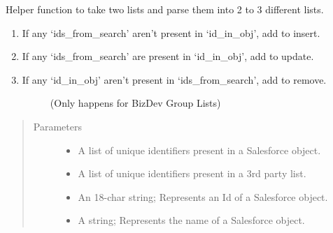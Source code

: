 \documentclass[letterpaper,10pt,english]{sphinxmanual}
\begin{document}

\begin{fulllineitems}
\label{\detokenize{index:ListManagement.utility.sf_helper.split_list}}
Helper function to take two lists and parse them into 2 to 3 different lists.
\begin{enumerate}
\def\theenumi{\arabic{enumi}}
\def\labelenumi{\theenumi )}
\makeatletter\def\p@enumii{\p@enumi \theenumi )}\makeatother
\item {} 
If any ‘ids\_from\_search’ aren’t present in ‘id\_in\_obj’, add to insert.

\item {} 
If any ‘ids\_from\_search’ are present in ‘id\_in\_obj’, add to update.

\item {} \begin{description}
\item[{If any ‘id\_in\_obj’ aren’t present in ‘ids\_from\_search’, add to remove.}] \leavevmode
(Only happens for BizDev Group Lists)

\end{description}

\end{enumerate}
\begin{quote}\begin{description}
\item[{Parameters}] \leavevmode\begin{itemize}
\item {} 
 \textendash{} A list of unique identifiers present in a Salesforce object.

\item {} 
 \textendash{} A list of unique identifiers present in a 3rd party list.

\item {} 
 \textendash{} An 18-char string; Represents an Id of a Salesforce object.

\item {} 
 \textendash{} A string; Represents the name of a Salesforce object.


\end{itemize}
\end{description}
\end{quote}
\end{fulllineitems}
\end{document}
